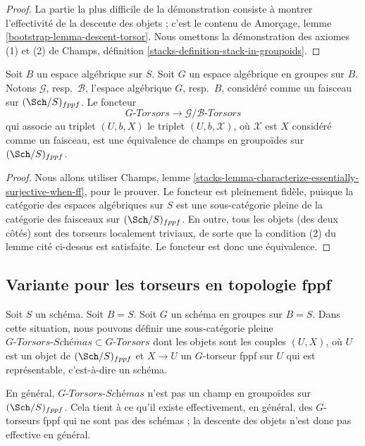 \begin{proof}
La partie la plus difficile de la démonstration consiste à montrer l'effectivité
de la descente des objets ; c'est le contenu de
Amorçage, lemme \ref{bootstrap-lemma-descent-torsor}.
Nous omettons la démonstration des axiomes (1) et (2) de
Champs, définition \ref{stacks-definition-stack-in-groupoids}.
\end{proof}

\begin{lemma}
\label{lemma-compare-torsors}
Soit $B$ un espace algébrique sur $S$. Soit $G$ un espace algébrique en
groupes sur $B$. Notons $\mathcal{G}$, resp.\ $\mathcal{B}$, l'espace algébrique
$G$, resp.\ $B$, considéré comme un faisceau sur $(\Sch/S)_{fppf}$.
Le foncteur
$$
G\textit{-Torsors} \longrightarrow \mathcal{G}/\mathcal{B}\textit{-Torsors}
$$
qui associe au triplet $(U, b, X)$ le triplet
$(U, b, \mathcal{X})$, où $\mathcal{X}$ est $X$ considéré comme un faisceau,
est une équivalence de champs en groupoïdes sur $(\Sch/S)_{fppf}$.
\end{lemma}

\begin{proof}
Nous allons utiliser
Champs, lemme \ref{stacks-lemma-characterize-essentially-surjective-when-ff},
pour le prouver. Le foncteur est pleinement fidèle, puisque la catégorie des
espaces algébriques sur $S$ est une sous-catégorie pleine de la catégorie des
faisceaux sur $(\Sch/S)_{fppf}$.
En outre, tous les objets (des deux côtés) sont des torseurs localement triviaux,
de sorte que la condition (2) du lemme cité ci-dessus est satisfaite.
Le foncteur est donc une équivalence.
\end{proof}



\subsection{Variante pour les torseurs en topologie fppf}
\label{subsection-variant-fppf-torsors}

\noindent
Soit $S$ un schéma. Soit $B = S$.
Soit $G$ un schéma en groupes sur $B = S$.
Dans cette situation, nous pouvons définir une sous-catégorie pleine
$G\textit{-Torsors-Schémas} \subset G\textit{-Torsors}$
dont les objets sont les couples $(U, X)$, où $U$ est un objet de
$(\Sch/S)_{fppf}$ et $X \to U$ un
$G$-torseur fppf sur $U$ qui est représentable, c'est-à-dire un schéma.

\medskip\noindent
En général, $G\textit{-Torsors-Schémas}$ n'est pas
un champ en groupoïdes sur $(\Sch/S)_{fppf}$. Cela tient
à ce qu'il existe effectivement, en général, des $G$-torseurs fppf
qui ne sont pas des schémas ; la descente des objets n'est donc pas effective
en général.




